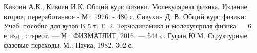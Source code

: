 \documentclass[a4paper,12pt]{article}
\begin{document}
\begin{thebibliography}{}
      Кикоин А.К., Кикоин И.К. Общий курс физики. Молекулярная физика. Издание второе, переработанное - М.: 1976. - 480 с.
      Сивухин Д. В. Общий курс физики: Учеб. пособие для вузов В 5 т. Т. 2. Термодинамика и молекулярная физика — 6-е изд., стереот. —
М.: ФИЗМАТЛИТ, 2016. — 544 с.
	 Гуфан Ю.М. Структурные фазовые переходы. М.:
Наука, 1982. 302 с.
\end{thebibliography}
\end{document}
